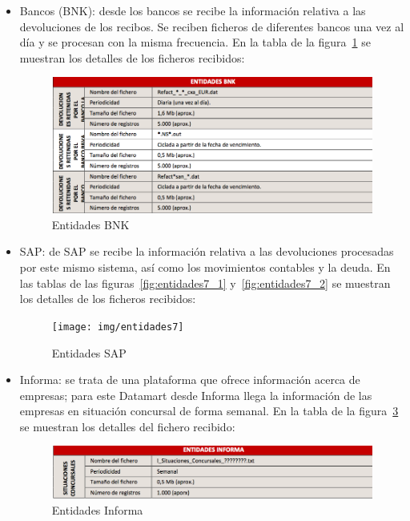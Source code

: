 \documentclass[a4paper, 12pt]{book}
\begin{document}
\begin{itemize}
	\item Bancos (BNK): desde los bancos se recibe la información relativa a las devoluciones de los recibos. Se reciben ficheros de diferentes bancos una vez al día y se procesan con la misma frecuencia. En la tabla de la figura~\ref{fig:entidades6} se muestran los detalles de los ficheros recibidos:

	\begin{figure}
	  \centering
	  \includegraphics[width=14cm, keepaspectratio]{img/entidades6}
	  \caption{Entidades BNK}
	  \label{fig:entidades6}
	\end{figure}

	\item SAP: de SAP se recibe la información relativa a las devoluciones procesadas por este mismo sistema, así como los movimientos contables y la deuda. En las tablas de las figuras~\ref{fig:entidades7_1} y~\ref{fig:entidades7_2} se muestran los detalles de los ficheros recibidos:

	\begin{figure}
	  \centering
	  \texttt{[image: img/entidades7]}
	  \caption{Entidades SAP}
	  \label{fig:entidades7}
	\end{figure}

	\item Informa: se trata de una plataforma que ofrece información acerca de empresas; para este Datamart desde Informa llega la información de las empresas en situación concursal de forma semanal. En la tabla de la figura~\ref{fig:entidades8} se muestran los detalles del fichero recibido:

	\begin{figure}
	  \centering
	  \includegraphics[width=14cm, keepaspectratio]{img/entidades8}
	  \caption{Entidades Informa}
	  \label{fig:entidades8}
	\end{figure}
	

\end{itemize}
\end{document}
